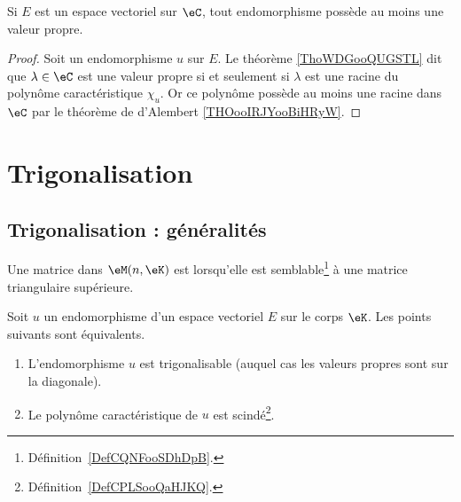\begin{proposition}     \label{PROPooLXGSooXmVcVG}
	Si \( E\) est un espace vectoriel sur \( \eC\), tout endomorphisme possède au moins une valeur propre.
\end{proposition}

\begin{proof}
	Soit un endomorphisme \( u\) sur \( E\). Le théorème \ref{ThoWDGooQUGSTL} dit que \( \lambda\in \eC\) est une valeur propre si et seulement si \( \lambda\) est une racine du polynôme caractéristique \( \chi_u\). Or ce polynôme possède au moins une racine dans \( \eC\) par le théorème de d'Alembert \ref{THOooIRJYooBiHRyW}.
\end{proof}


\section{Trigonalisation}

\subsection{Trigonalisation : généralités}
\label{SUBSECooMCOGooEoQCsz}

\begin{definition}
	Une matrice dans \( \eM(n,\eK)\) est  lorsqu'elle est semblable\footnote{Définition~\ref{DefCQNFooSDhDpB}.} à une matrice triangulaire supérieure.
\end{definition}

\begin{proposition} \label{PropKNVFooQflQsJ}
	Soit \( u\) un endomorphisme d'un espace vectoriel \( E\) sur le corps \( \eK\). Les points suivants sont équivalents.
	\begin{enumerate}
		\item   \label{ItemZKDMooOrTHkwi}
		      L'endomorphisme \( u\) est trigonalisable (auquel cas les valeurs propres sont sur la diagonale).
		\item   \label{ItemZKDMooOrTHkwii}
		      Le polynôme caractéristique de \( u\) est scindé\footnote{Définition~\ref{DefCPLSooQaHJKQ}.}.
	\end{enumerate}
\end{proposition}

